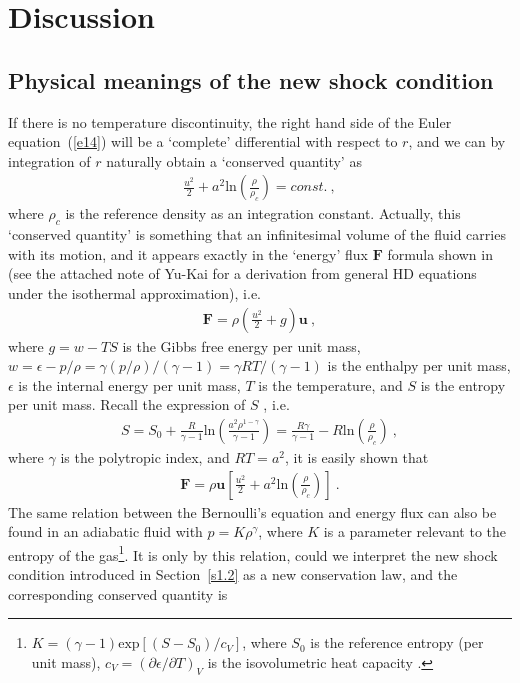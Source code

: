 \documentclass[fleqn,usenatbib]{mnras}
\begin{document}
\section{Discussion}
\label{s3}
\subsection{Physical meanings of the new shock condition}
If there is no temperature discontinuity, the right hand side of the Euler equation~(\ref{e14}) will be a `complete' differential with respect to $r$, and we can by integration of $r$ naturally obtain a `conserved quantity' as
\begin{gather}
\frac{u^{2}}{2}+a^{2}\mathrm{ln}\left(\frac{\rho}{\rho_{c}}\right)=const.\ ,\label{e29}
\end{gather}
where $\rho_{c}$ is the reference density as an integration constant. Actually, this `conserved quantity' is something that an infinitesimal volume of the fluid carries with its motion, and it appears exactly in the `energy' flux $\mathbf{F}$ formula shown in \citet{lou2004envelope} (see the attached note of Yu-Kai for a derivation from general HD equations under the isothermal approximation), i.e.
\begin{gather}
\mathbf{F}=\rho\left(\frac{u^{2}}{2}+g\right)\textbf{u}\ ,\label{e30}
\end{gather}
where $g=w-TS$ is the Gibbs free energy per unit mass, $w=\epsilon-p/\rho=\gamma(p/\rho)/(\gamma-1)=\gamma RT/(\gamma-1)$ is the enthalpy per unit mass, $\epsilon$ is the internal energy per unit mass, $T$ is the temperature, and $S$ is the entropy per unit mass. Recall the expression of $S$ \citep{SFSW}, i.e.
\begin{gather}
S=S_{0}+\frac{R}{\gamma-1}\mathrm{ln}\left(\frac{a^{2}\rho^{1-\gamma}}{\gamma-1}\right)=\frac{R\gamma}{\gamma-1}-R\mathrm{ln}\left(\frac{\rho}{\rho_{c}}\right)\ ,\label{e31}
\end{gather}
where $\gamma$ is the polytropic index, and $RT=a^{2}$, it is easily shown that 
\begin{gather}
\mathbf{F}=\rho\mathbf{u}\left[\frac{u^{2}}{2}+a^{2}\mathrm{ln}\left(\frac{\rho}{\rho_{c}}\right)\right]\ .\label{e32}
\end{gather}
The same relation between the Bernoulli's equation and energy flux can also be found in an adiabatic fluid with $p=K\rho^{\gamma}$, where $K$ is a parameter relevant to the entropy of the gas\footnote{$K=(\gamma-1)\mathrm{exp}\left[(S-S_{0})/c_{V}\right]$, where $S_{0}$ is the reference entropy (per unit mass), $c_{V}=(\partial\epsilon/\partial T)_{V}$ is the isovolumetric heat capacity \citep{SFSW}.}. It is only by this relation, could we interpret the new shock condition introduced in Section~\ref{s1.2} as a new conservation law, and the corresponding conserved quantity is 
\end{document}
